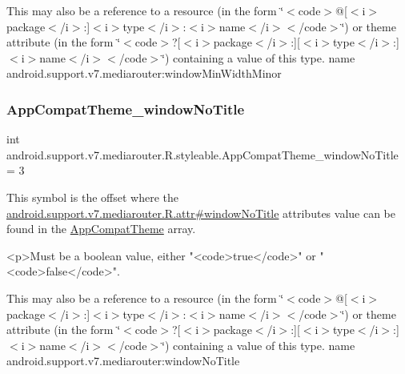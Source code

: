 This may also be a reference to a resource (in the form \char`\"{}$<$code$>$@\mbox{[}$<$i$>$package$<$/i$>$\+:\mbox{]}$<$i$>$type$<$/i$>$\+:$<$i$>$name$<$/i$>$$<$/code$>$\char`\"{}) or theme attribute (in the form \char`\"{}$<$code$>$?\mbox{[}$<$i$>$package$<$/i$>$\+:\mbox{]}\mbox{[}$<$i$>$type$<$/i$>$\+:\mbox{]}$<$i$>$name$<$/i$>$$<$/code$>$\char`\"{}) containing a value of this type.  name android.\+support.\+v7.\+mediarouter\+:window\+Min\+Width\+Minor \mbox{\label{classandroid_1_1support_1_1v7_1_1mediarouter_1_1R_1_1styleable_a26662431b0c47b968955d940dc4adc24}} 
\subsubsection{\texorpdfstring{App\+Compat\+Theme\+\_\+window\+No\+Title}{AppCompatTheme\_windowNoTitle}}
{\footnotesize\ttfamily int android.\+support.\+v7.\+mediarouter.\+R.\+styleable.\+App\+Compat\+Theme\+\_\+window\+No\+Title = 3\hspace{0.3cm}{\ttfamily [static]}}

This symbol is the offset where the \hyperlink{classandroid_1_1support_1_1v7_1_1mediarouter_1_1R_1_1attr_a66963fa72a2f109826b4838d68850ae1}{android.\+support.\+v7.\+mediarouter.\+R.\+attr\#window\+No\+Title} attribute\textquotesingle{}s value can be found in the \hyperlink{classandroid_1_1support_1_1v7_1_1mediarouter_1_1R_1_1styleable_a4e3d3900c75d49aeb2f283cac00214d6}{App\+Compat\+Theme} array.

\begin{DoxyVerb}      <p>Must be a boolean value, either "<code>true</code>" or "<code>false</code>".
\end{DoxyVerb}
 

This may also be a reference to a resource (in the form \char`\"{}$<$code$>$@\mbox{[}$<$i$>$package$<$/i$>$\+:\mbox{]}$<$i$>$type$<$/i$>$\+:$<$i$>$name$<$/i$>$$<$/code$>$\char`\"{}) or theme attribute (in the form \char`\"{}$<$code$>$?\mbox{[}$<$i$>$package$<$/i$>$\+:\mbox{]}\mbox{[}$<$i$>$type$<$/i$>$\+:\mbox{]}$<$i$>$name$<$/i$>$$<$/code$>$\char`\"{}) containing a value of this type.  name android.\+support.\+v7.\+mediarouter\+:window\+No\+Title \mbox{\label{classandroid_1_1support_1_1v7_1_1mediarouter_1_1R_1_1styleable_a79256b2584517e9cb65dff8f9bc2bb71}} 
